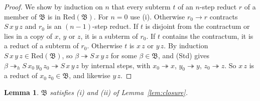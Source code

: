 \documentclass[11pt]{amsart}
\newtheorem{lemma}[theorem]{Lemma}
\theoremstyle{definition}
\newcommand{\red}{\twoheadrightarrow}
\newcommand{\hred}{\twoheadrightarrow_h}
\newcommand{\B}{\mathfrak B}
\newcommand{\Red}{\mathrm{Red}}
\begin{document}
\begin{proof}
We show by induction on $n$ that every subterm $t$ of an $n$-step reduct $r$ of a member of $\B$ is
in $\Red(\B)$. For $n=0$ use (i). Otherwise $r_0\to r$ contracts $S\,x\,y\,z$ and $r_0$ is an
$(n-1)$-step reduct. If $t$ is disjoint from the contractum or lies in a copy of $x$, $y$ or $z$, it is
a subterm of $r_0$. If $t$ contains the contractum, it is a reduct of a subterm of $r_0$. Otherwise
$t$ is $x\,z$ or $y\,z$. By induction $S\,x\,y\,z\in\Red(\B)$, so $\beta\red S\,x\,y\,z$ for some
$\beta\in\B$, and (Std) gives $\beta\hred S\,x_0\,y_0\,z_0\red S\,x\,y\,z$ by internal steps, with
$x_0\red x$, $y_0\red y$, $z_0\red z$. So $x\,z$ is a reduct of $x_0\,z_0\in\B$, and likewise $y\,z$.
\end{proof}

\begin{lemma}\label{lem:typing}
$\B$ satisfies \textup{(i)} and \textup{(ii)} of Lemma~\ref{lem:closure}.
\end{lemma}
\end{document}
